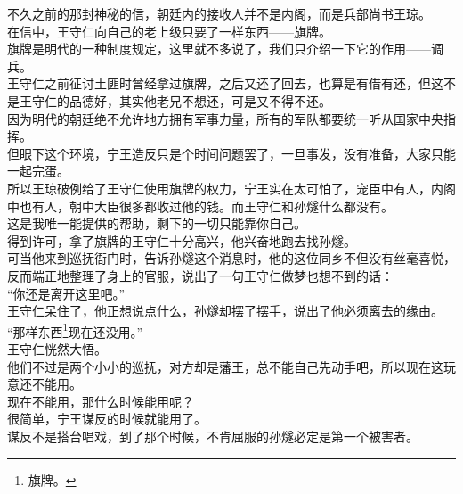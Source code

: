 \begin{multicols}{\theparacolNo}
不久之前的那封神秘的信，朝廷内的接收人并不是内阁，而是兵部尚书王琼。\\

在信中，王守仁向自己的老上级只要了一样东西——旗牌。\\

旗牌是明代的一种制度规定，这里就不多说了，我们只介绍一下它的作用——调兵。\\

王守仁之前征讨土匪时曾经拿过旗牌，之后又还了回去，也算是有借有还，但这不是王守仁的品德好，其实他老兄不想还，可是又不得不还。\\

因为明代的朝廷绝不允许地方拥有军事力量，所有的军队都要统一听从国家中央指挥。\\

但眼下这个环境，宁王造反只是个时间问题罢了，一旦事发，没有准备，大家只能一起完蛋。\\

所以王琼破例给了王守仁使用旗牌的权力，宁王实在太可怕了，宠臣中有人，内阁中也有人，朝中大臣很多都收过他的钱。而王守仁和孙燧什么都没有。\\

这是我唯一能提供的帮助，剩下的一切只能靠你自己。\\

得到许可，拿了旗牌的王守仁十分高兴，他兴奋地跑去找孙燧。\\

可当他来到巡抚衙门时，告诉孙燧这个消息时，他的这位同乡不但没有丝毫喜悦，反而端正地整理了身上的官服，说出了一句王守仁做梦也想不到的话：\\

“你还是离开这里吧。”\\

王守仁呆住了，他正想说点什么，孙燧却摆了摆手，说出了他必须离去的缘由。\\

“那样东西\footnote{旗牌。}现在还没用。”\\

王守仁恍然大悟。\\

他们不过是两个小小的巡抚，对方却是藩王，总不能自己先动手吧，所以现在这玩意还不能用。\\

现在不能用，那什么时候能用呢？\\

很简单，宁王谋反的时候就能用了。\\

谋反不是搭台唱戏，到了那个时候，不肯屈服的孙燧必定是第一个被害者。\\


\end{multicols}
